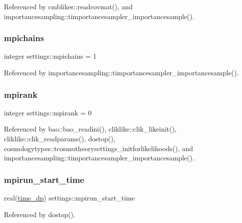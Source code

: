 Referenced by cmblikes\+::readcovmat(), and importancesampling\+::timportancesampler\+\_\+importancesample().

\mbox{\label{namespacesettings_a9cb321eeb7d7d329d5d99cba2595330d}} 
\subsubsection{\texorpdfstring{mpichains}{mpichains}}
{\footnotesize\ttfamily integer settings\+::mpichains = 1}



Referenced by importancesampling\+::timportancesampler\+\_\+importancesample().

\mbox{\label{namespacesettings_ad6fd77f9480fb92754b6f5890017e594}} 
\subsubsection{\texorpdfstring{mpirank}{mpirank}}
{\footnotesize\ttfamily integer settings\+::mpirank = 0}



Referenced by bao\+::bao\+\_\+readini(), cliklike\+::clik\+\_\+likeinit(), cliklike\+::clik\+\_\+readparams(), dostop(), cosmologytypes\+::tcosmotheorysettings\+\_\+initforlikelihoods(), and importancesampling\+::timportancesampler\+\_\+importancesample().

\mbox{\label{namespacesettings_afe15c9b4b37c62135a2e5d12810b92bc}} 
\subsubsection{\texorpdfstring{mpirun\+\_\+start\+\_\+time}{mpirun\_start\_time}}
{\footnotesize\ttfamily real(\mbox{\hyperlink{namespacesettings_a3d81f31b9e0eef8de19fb9b016043af7}{time\+\_\+dp}}) settings\+::mpirun\+\_\+start\+\_\+time}



Referenced by dostop().

\mbox{\label{namespacesettings_ac176aa2a57ff28bd3d05a0a2f2b4defa}} 
